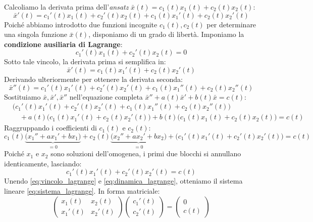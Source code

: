 \begin{dimostrazione}
Calcoliamo la derivata prima dell'\emph{ansatz} $\bar{x}(t) = c_1(t)x_1(t) + c_2(t)x_2(t)$:
\[
    \bar{x}'(t) = c_1'(t) x_1(t) + c_2'(t) x_2(t) + c_1(t) x_1'(t) + c_2(t) x_2'(t)
\]
Poiché abbiamo introdotto due funzioni incognite $c_1(t), c_2(t)$ per determinare una singola funzione $\bar{x}(t)$, disponiamo di un grado di libertà. Imponiamo la \textbf{condizione ausiliaria di Lagrange}:
\begin{equation}
    \label{eq:vincolo_lagrange}
    c_1'(t) x_1(t) + c_2'(t) x_2(t) = 0
\end{equation}
Sotto tale vincolo, la derivata prima si semplifica in:
\[
    \bar{x}'(t) = c_1(t) x_1'(t) + c_2(t) x_2'(t)
\]
Derivando ulteriormente per ottenere la derivata seconda:
\[
    \bar{x}''(t) = c_1'(t) x_1'(t) + c_2'(t) x_2'(t) + c_1(t) x_1''(t) + c_2(t) x_2''(t)
\]
Sostituiamo $\bar{x}, \bar{x}', \bar{x}''$ nell'equazione completa $\bar{x}'' + a(t)\bar{x}' + b(t)\bar{x} = c(t)$:
\begin{align*}
    &\big( c_1'(t) x_1'(t) + c_2'(t) x_2'(t) + c_1(t) x_1''(t) + c_2(t) x_2''(t) \big) \\
    &\quad + a(t) \big( c_1(t) x_1'(t) + c_2(t) x_2'(t) \big) + b(t) \big( c_1(t) x_1(t) + c_2(t) x_2(t) \big) = c(t)
\end{align*}
Raggruppando i coefficienti di $c_1(t)$ e $c_2(t)$:
\[
    c_1(t) \underbrace{\big( x_1'' + a x_1' + b x_1 \big)}_{= 0} + c_2(t) \underbrace{\big( x_2'' + a x_2' + b x_2 \big)}_{= 0} + \big( c_1'(t) x_1'(t) + c_2'(t) x_2'(t) \big) = c(t)
\]
Poiché $x_1$ e $x_2$ sono soluzioni dell'omogenea, i primi due blocchi si annullano identicamente, lasciando:
\begin{equation}
    \label{eq:dinamica_lagrange}
    c_1'(t) x_1'(t) + c_2'(t) x_2'(t) = c(t)
\end{equation}
Unendo \eqref{eq:vincolo_lagrange} e \eqref{eq:dinamica_lagrange}, otteniamo il sistema lineare \eqref{eq:sistema_lagrange}.
In forma matriciale:
\[
    \begin{pmatrix} x_1(t) & x_2(t) \\ x_1'(t) & x_2'(t) \end{pmatrix} \begin{pmatrix} c_1'(t) \\ c_2'(t) \end{pmatrix} = \begin{pmatrix} 0 \\ c(t) \end{pmatrix}
\]
\end{dimostrazione}
